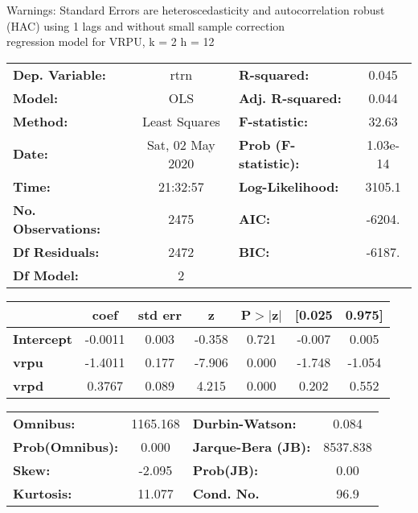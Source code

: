 Warnings: \newline
 [1] Standard Errors are heteroscedasticity and autocorrelation robust (HAC) using 1 lags and without small sample correction\\ 

regression model for VRPU, k = 2 h = 12\begin{center}
\begin{tabular}{lclc}
\toprule
\textbf{Dep. Variable:}    &       rtrn       & \textbf{  R-squared:         } &     0.045   \\
\textbf{Model:}            &       OLS        & \textbf{  Adj. R-squared:    } &     0.044   \\
\textbf{Method:}           &  Least Squares   & \textbf{  F-statistic:       } &     32.63   \\
\textbf{Date:}             & Sat, 02 May 2020 & \textbf{  Prob (F-statistic):} &  1.03e-14   \\
\textbf{Time:}             &     21:32:57     & \textbf{  Log-Likelihood:    } &    3105.1   \\
\textbf{No. Observations:} &        2475      & \textbf{  AIC:               } &    -6204.   \\
\textbf{Df Residuals:}     &        2472      & \textbf{  BIC:               } &    -6187.   \\
\textbf{Df Model:}         &           2      & \textbf{                     } &             \\
\bottomrule
\end{tabular}
\begin{tabular}{lcccccc}
                   & \textbf{coef} & \textbf{std err} & \textbf{z} & \textbf{P$> |$z$|$} & \textbf{[0.025} & \textbf{0.975]}  \\
\midrule
\textbf{Intercept} &      -0.0011  &        0.003     &    -0.358  &         0.721        &       -0.007    &        0.005     \\
\textbf{vrpu}      &      -1.4011  &        0.177     &    -7.906  &         0.000        &       -1.748    &       -1.054     \\
\textbf{vrpd}      &       0.3767  &        0.089     &     4.215  &         0.000        &        0.202    &        0.552     \\
\bottomrule
\end{tabular}
\begin{tabular}{lclc}
\textbf{Omnibus:}       & 1165.168 & \textbf{  Durbin-Watson:     } &    0.084  \\
\textbf{Prob(Omnibus):} &   0.000  & \textbf{  Jarque-Bera (JB):  } & 8537.838  \\
\textbf{Skew:}          &  -2.095  & \textbf{  Prob(JB):          } &     0.00  \\
\textbf{Kurtosis:}      &  11.077  & \textbf{  Cond. No.          } &     96.9  \\
\bottomrule
\end{tabular}
\end{center}

